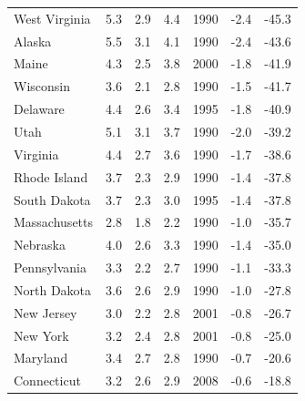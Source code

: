 \begin{longtable}{lllllll}
West Virginia & 5.3 & 2.9 & 4.4 & 1990 & -2.4 & -45.3 \\
Alaska & 5.5 & 3.1 & 4.1 & 1990 & -2.4 & -43.6 \\
Maine & 4.3 & 2.5 & 3.8 & 2000 & -1.8 & -41.9 \\
Wisconsin & 3.6 & 2.1 & 2.8 & 1990 & -1.5 & -41.7 \\
Delaware & 4.4 & 2.6 & 3.4 & 1995 & -1.8 & -40.9 \\
Utah & 5.1 & 3.1 & 3.7 & 1990 & -2.0 & -39.2 \\
Virginia & 4.4 & 2.7 & 3.6 & 1990 & -1.7 & -38.6 \\
Rhode Island & 3.7 & 2.3 & 2.9 & 1990 & -1.4 & -37.8 \\
South Dakota & 3.7 & 2.3 & 3.0 & 1995 & -1.4 & -37.8 \\
Massachusetts & 2.8 & 1.8 & 2.2 & 1990 & -1.0 & -35.7 \\
Nebraska & 4.0 & 2.6 & 3.3 & 1990 & -1.4 & -35.0 \\
Pennsylvania & 3.3 & 2.2 & 2.7 & 1990 & -1.1 & -33.3 \\
North Dakota & 3.6 & 2.6 & 2.9 & 1990 & -1.0 & -27.8 \\
New Jersey & 3.0 & 2.2 & 2.8 & 2001 & -0.8 & -26.7 \\
New York & 3.2 & 2.4 & 2.8 & 2001 & -0.8 & -25.0 \\
Maryland & 3.4 & 2.7 & 2.8 & 1990 & -0.7 & -20.6 \\
Connecticut & 3.2 & 2.6 & 2.9 & 2008 & -0.6 & -18.8 \\

\end{longtable}
